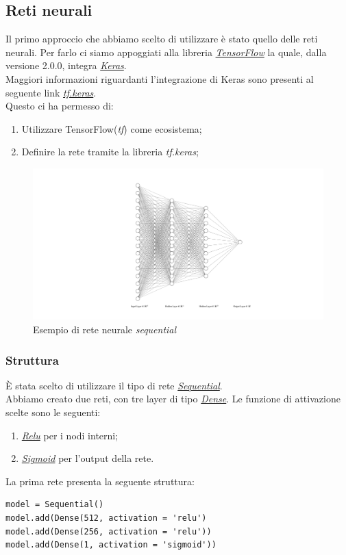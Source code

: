 \subsection{Reti neurali}
Il primo approccio che abbiamo scelto di utilizzare è stato quello delle reti neurali.
Per farlo ci siamo appoggiati alla libreria \href{https://www.tensorflow.org/}{\textit{TensorFlow}} la quale, dalla versione 2.0.0, integra \href{https://keras.io/}{\textit{Keras}}.\\
Maggiori informazioni riguardanti l'integrazione di Keras sono presenti al seguente link \href{https://www.tensorflow.org/guide/keras}{\textit{tf.keras}}.\\ 
Questo ci ha permesso di:
\begin{enumerate}
	\item Utilizzare TensorFlow(\textit{tf}) come ecosistema;
	\item Definire la rete tramite la libreria \textit{tf.keras};
\end{enumerate} 
\begin{figure}[H]
	\includegraphics[keepaspectratio = true, scale=0.4,center]{img/nnExample.png}
	\caption{Esempio di rete neurale \textit{sequential}}
\end{figure}

\subsubsection{Struttura}
È stata scelto di utilizzare il tipo di rete \href{https://keras.io/getting-started/sequential-model-guide/}{\textit{Sequential}}.\\ 
Abbiamo creato due reti, con tre layer di tipo \href{https://keras.io/layers/core/}{\textit{Dense}}.
Le funzione di attivazione scelte sono le seguenti:
\begin{enumerate}
	\item \href{https://keras.io/activations/#relu}{\textit{Relu}} per i nodi interni;
	\item \href{https://keras.io/activations/#sigmoid}{\textit{Sigmoid}} per l'output della rete.
\end{enumerate}
La prima rete presenta la seguente struttura:
\begin{lstlisting}[backgroundcolor = \color{white}]
model = Sequential()  
model.add(Dense(512, activation = 'relu')
model.add(Dense(256, activation = 'relu'))
model.add(Dense(1, activation = 'sigmoid'))
\end{lstlisting}



